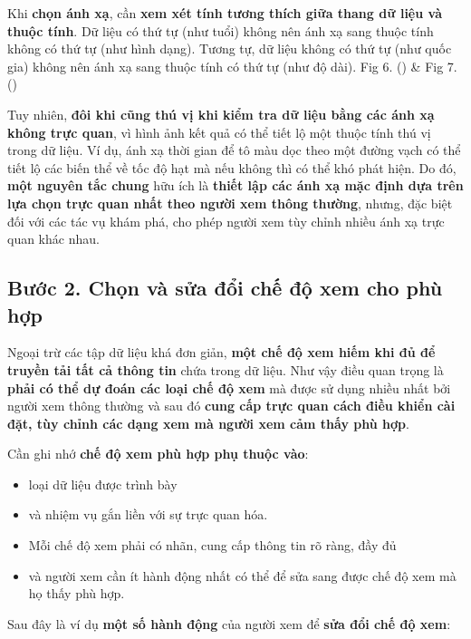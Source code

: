 Khi \textbf{chọn ánh xạ}, cần \textbf{xem xét tính tương thích giữa
thang dữ liệu và thuộc tính}. Dữ liệu có thứ tự (như tuổi) không nên ánh
xạ sang thuộc tính không có thứ tự (như hình dạng). Tương tự, dữ liệu
không có thứ tự (như quốc gia) không nên ánh xạ sang thuộc tính có thứ
tự (như độ dài). Fig 6. () \& Fig 7. ()

Tuy nhiên, \textbf{đôi khi cũng thú vị khi kiểm tra dữ liệu bằng các ánh
xạ không trực quan}, vì hình ảnh kết quả có thể tiết lộ một thuộc tính
thú vị trong dữ liệu. Ví dụ, ánh xạ thời gian để tô màu dọc theo một
đường vạch có thể tiết lộ các biến thể về tốc độ hạt mà nếu không thì có
thể khó phát hiện. Do đó, \textbf{một nguyên tắc chung} hữu ích là
\textbf{thiết lập các ánh xạ mặc định dựa trên lựa chọn trực quan nhất
theo người xem thông thường}, nhưng, đặc biệt đối với các tác vụ khám
phá, cho phép người xem tùy chỉnh nhiều ánh xạ trực quan khác nhau.

\subsection{Bước 2. Chọn và sửa đổi chế độ xem cho phù
hợp}\label{bux1b0ux1edbc-2.-chux1ecdn-vuxe0-sux1eeda-ux111ux1ed5i-chux1ebf-ux111ux1ed9-xem-cho-phuxf9-hux1ee3p}

Ngoại trừ các tập dữ liệu khá đơn giản, \textbf{một chế độ xem hiếm khi
đủ để truyền tải tất cả thông tin} chứa trong dữ liệu. Như vậy điều quan
trọng là \textbf{phải có thể dự đoán các loại chế độ xem} mà được sử
dụng nhiều nhất bởi người xem thông thường và sau đó \textbf{cung cấp
trực quan cách điều khiển cài đặt, tùy chỉnh các dạng xem mà người xem
cảm thấy phù hợp}.

Cần ghi nhớ \textbf{chế độ xem phù hợp phụ thuộc vào}:

\begin{itemize}
\tightlist
\item
  loại dữ liệu được trình bày
\item
  và nhiệm vụ gắn liền với sự trực quan hóa.
\item
  Mỗi chế độ xem phải có nhãn, cung cấp thông tin rõ ràng, đầy đủ
\item
  và người xem cần ít hành động nhất có thể để sửa sang được chế độ xem
  mà họ thấy phù hợp.
\end{itemize}

Sau đây là ví dụ \textbf{một số hành động} của người xem để \textbf{sửa
đổi chế độ xem}:

